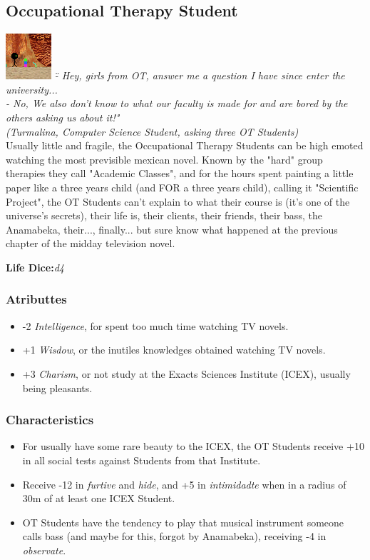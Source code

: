 \documentclass[ letterpaper,12pt]{article}
\begin{document}
{\subsection{Occupational Therapy Student}
\includegraphics{../data/classes/Img/to.png}
{\it \" - Hey,  girls  from  OT, answer me  a question  I  have  since  enter  the university...\\
        - No,  We  also  don't  know to  what our faculty is made for and are bored  by the others asking us about it!"\\
        (Turmalina,  Computer  Science   Student, asking three OT Students)}\\

Usually   little    and    fragile,   the Occupational Therapy Students can be high emoted  watching  the  most  previsible mexican novel. Known by the "hard"  group therapies  they  call "Academic Classes", and for the hours spent painting a little paper like a three years child (and FOR a three   years    child),    calling    it "Scientific  Project",  the  OT  Students can't  explain  to  what  their course is (it's one  of  the  universe's  secrets), their  life  is,  their  clients,   their friends,   their   bass,  the  Anamabeka, their..., finally... but sure  know  what happened at the previous  chapter  of the midday television novel.

{\bf Life Dice:}{\it d4}\\

\subsubsection{Atributtes}
\begin{itemize}
\item{-2 {\it Intelligence}, for spent too much time watching TV novels.}
\item{+1 {\it Wisdow}, or the inutiles knowledges obtained watching TV novels.}
\item{+3 {\it Charism}, or  not  study  at   the Exacts Sciences Institute (ICEX), usually being pleasants.}
\end{itemize}


\subsubsection{Characteristics}
\begin{itemize}
\item{For usually have some rare  beauty to the ICEX, the OT Students receive +10 in  all social tests against Students  from  that Institute.}
\item{Receive -12 in {\it furtive} and {\it hide}, and +5 in {\it intimidadte} when in a radius of 30m of at least one ICEX Student.}
\item{OT Students have  the  tendency  to  play that  musical  instrument  someone  calls bass  (and  maybe  for  this,  forgot  by Anamabeka), receiving -4 in {\it observate}.}
\end{itemize}


}
\end{document}
